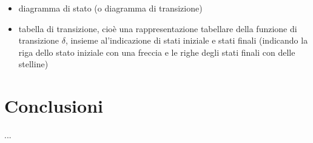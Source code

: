 \documentclass[]{article}
\begin{document}
\begin{itemize}
    \item diagramma di stato (o diagramma di transizione)
    \item tabella di transizione, cioè una rappresentazione tabellare della funzione di transizione \mbox{$\delta$}, insieme al'indicazione di stati iniziale e stati finali (indicando la riga dello stato iniziale con una freccia e le righe degli stati finali con delle stelline)
\end{itemize}



\newpage
\section*{Conclusioni}

...
\end{document}
